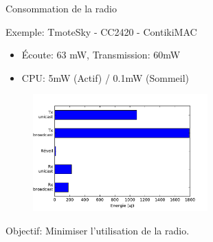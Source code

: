 \begin{frame}{Consommation de la radio}

  \begin{block}{Exemple: TmoteSky - CC2420 - ContikiMAC}
    \begin{itemize}
      \item Écoute: 63 mW, Transmission: 60mW
      \item CPU: 5mW (Actif) / 0.1mW (Sommeil)
    \end{itemize}
  \end{block}

  \begin{figure}
    \centering
    \includegraphics[width=0.6\textwidth]{figures/consommation_contikimac.pdf}
  \end{figure}

  Objectif: Minimiser l'utilisation de la radio.
\end{frame}

\DeclarePairedDelimiter{\ceil}{\lceil}{\rceil}

\newcommand{\mycbox}[1]{\tikz{\path[draw=mycolor,fill=mycolor] (0,0) rectangle (.3cm,.3cm);}}

